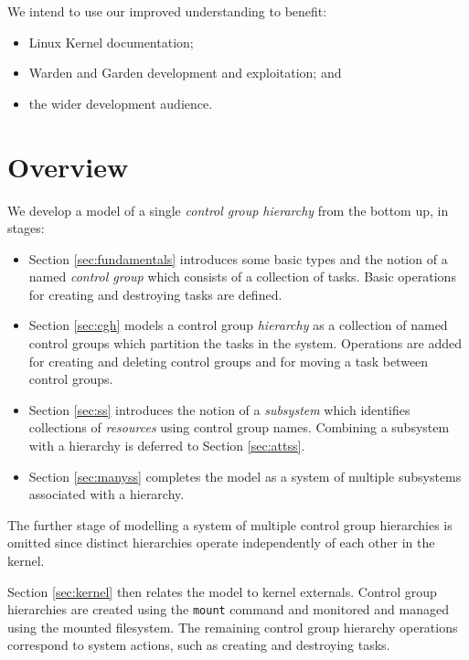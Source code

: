 \documentclass[a4paper,twoside,12pt]{article}
\begin{document}
We intend to use our improved understanding to benefit:
\begin{itemize}
\item Linux Kernel documentation;
\item Warden\cite{warden} and Garden\cite{garden} development and exploitation; and
\item the wider development audience.
\end{itemize}

\section{Overview}

We develop a model of a single \textit{control group hierarchy} from the bottom up, in stages:
\begin{itemize}
\item Section \ref{sec:fundamentals} introduces some basic types and the notion of a named \textit{control group} which consists of a
collection of tasks. Basic operations for creating and destroying tasks are defined.
\item  Section \ref{sec:cgh} models a control group \textit{hierarchy} as a collection of named control groups which partition the tasks
in the system. Operations are added for creating and deleting control groups and for moving a task between control groups.
\item Section \ref{sec:ss} introduces the notion of a \textit{subsystem} which identifies collections of \textit{resources} using control group names. Combining a subsystem with a hierarchy is deferred to Section \ref{sec:attss}.
\item Section \ref{sec:manyss} completes the model as a system of multiple subsystems associated with a hierarchy.
\end{itemize}

The further stage of modelling a system of multiple control group hierarchies is omitted since distinct hierarchies operate independently of each other in the kernel.

Section \ref{sec:kernel} then relates the model to kernel externals. Control group hierarchies are created using the \texttt{mount} command and monitored and managed using the mounted filesystem. The remaining control group hierarchy operations correspond to system actions, such as creating and destroying tasks.

\end{document}
